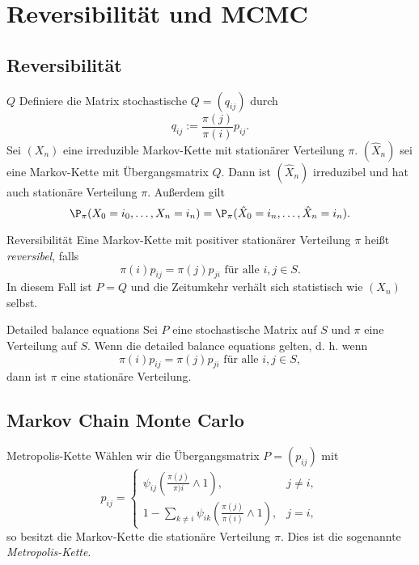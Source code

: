 \section{Reversibilität und MCMC}

\subsection*{Reversibilität}

\begin{karte}{\(Q\)}
    Definiere die Matrix stochastische \(Q = (q_{ij})\) durch 
    \[ q_{ij} := \frac{\pi(j)}{\pi(i)} p_{ij}. \]
    Sei \((X_n)\) eine irreduzible Markov-Kette mit stationärer Verteilung \(\pi\).
    \((\hat{X}_n)\) sei eine Markov-Kette mit Übergangsmatrix \(Q\).
    Dann ist \((\hat{X}_n)\) irreduzibel und hat auch stationäre Verteilung \(\pi\).
    Außerdem gilt
    \[ \P_\pi(X_0 = i_0,\ldots, X_n = i_n) = \P_\pi (\hat{X}_0 = i_n, \ldots, \hat{X}_n = i_n). \]
\end{karte}

\begin{karte}{Reversibilität}
    Eine Markov-Kette mit positiver stationärer Verteilung \(\pi\) 
    heißt \textit{reversibel}, falls 
    \[ \pi(i) p_{ij} = \pi(j) p_{ji} \text{ für alle } i,j\in S. \]
    In diesem Fall ist \(P=Q\) und die Zeitumkehr verhält sich statistisch wie \((X_n)\) selbst.
\end{karte}

\begin{karte}{Detailed balance equations}
    Sei \(P\) eine stochastische Matrix auf \(S\) und \(\pi\) eine Verteilung auf \(S\). 
    Wenn die detailed balance equations gelten, d. h. wenn 
    \[ \pi(i) p_{ij} = \pi(j) p_{ji} \text{ für alle } i,j\in S, \]
    dann ist \(\pi\) eine stationäre Verteilung.
\end{karte}

\subsection*{Markov Chain Monte Carlo}

\begin{karte}{Metropolis-Kette}
    Wählen wir die Übergangsmatrix \(P=(p_{ij})\) mit 
    \[ p_{ij} = \begin{cases}
        \psi_{ij} \left( \frac{\pi(j)}{\pi)i} \wedge 1 \right), & j\neq i, \\
        1 - \sum_{k\neq i} \psi_{ik} \left( \frac{\pi(j)}{\pi(i)} \wedge 1 \right), & j = i,
    \end{cases} \]
    so besitzt die Markov-Kette die stationäre Verteilung \(\pi\). Dies ist die sogenannte 
    \textit{Metropolis-Kette}.
\end{karte}